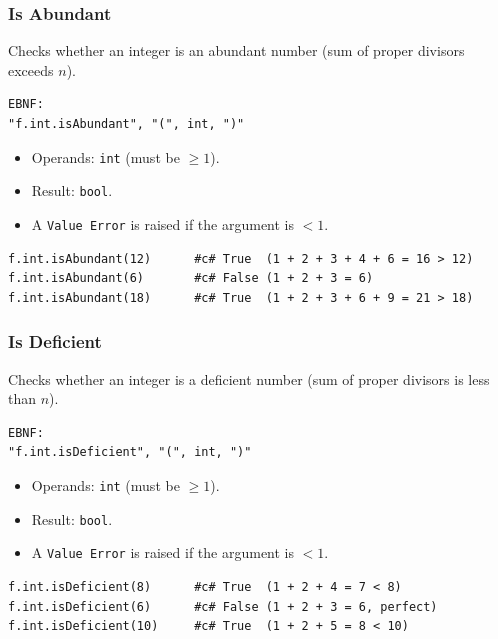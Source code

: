 \subsubsection{Is Abundant}
Checks whether an integer is an abundant number (sum of proper divisors exceeds $n$).
\begin{verbatim}
EBNF:
"f.int.isAbundant", "(", int, ")"
\end{verbatim}
\begin{itemize}
\item Operands: \texttt{int} (must be $\geq 1$).
\item Result: \texttt{bool}.
\item A \texttt{Value Error} is raised if the argument is $< 1$.
\end{itemize}
\begin{verbatim}
f.int.isAbundant(12)      #c# True  (1 + 2 + 3 + 4 + 6 = 16 > 12)
f.int.isAbundant(6)       #c# False (1 + 2 + 3 = 6)
f.int.isAbundant(18)      #c# True  (1 + 2 + 3 + 6 + 9 = 21 > 18)
\end{verbatim}

\subsubsection{Is Deficient}
Checks whether an integer is a deficient number (sum of proper divisors is less than $n$).
\begin{verbatim}
EBNF:
"f.int.isDeficient", "(", int, ")"
\end{verbatim}
\begin{itemize}
\item Operands: \texttt{int} (must be $\geq 1$).
\item Result: \texttt{bool}.
\item A \texttt{Value Error} is raised if the argument is $< 1$.
\end{itemize}
\begin{verbatim}
f.int.isDeficient(8)      #c# True  (1 + 2 + 4 = 7 < 8)
f.int.isDeficient(6)      #c# False (1 + 2 + 3 = 6, perfect)
f.int.isDeficient(10)     #c# True  (1 + 2 + 5 = 8 < 10)
\end{verbatim}

